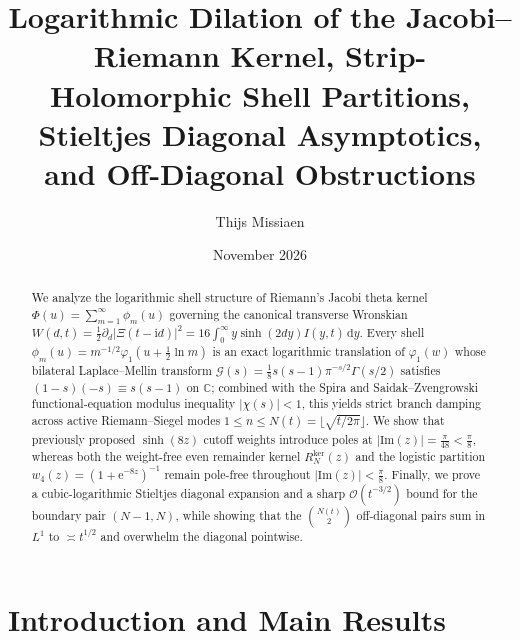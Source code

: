 \documentclass[11pt,reqno]{amsart}
\title[Logarithmic Dilation and Saddle-Point Shell Structure]{Logarithmic Dilation of the Jacobi--Riemann Kernel, Strip-Holomorphic Shell Partitions, Stieltjes Diagonal Asymptotics, and Off-Diagonal Obstructions}
\author{Thijs Missiaen}
\date{November 2026}
\theoremstyle{definition}
\theoremstyle{remark}
\numberwithin{equation}{section}
\newcommand{\C}{\mathbb{C}}
\newcommand{\dd}{\mathrm{d}}
\newcommand{\ii}{\mathrm{i}}
\newcommand{\ee}{\mathrm{e}}
\newcommand{\Ima}{\mathrm{Im}}
\begin{document}
\begin{abstract}
We analyze the logarithmic shell structure of Riemann's Jacobi theta kernel $\Phi(u) = \sum_{m=1}^{\infty} \phi_m(u)$ governing the canonical transverse Wronskian $W(d,t) = \frac{1}{2}\partial_d\lvert\Xi(t - \ii d)\rvert^2 = 16\int_0^{\infty} y\sinh(2dy)I(y,t)\,\dd y$. Every shell $\phi_m(u) = m^{-1/2}\varphi_1(u + \frac{1}{2}\ln m)$ is an exact logarithmic translation of $\varphi_1(w)$ whose bilateral Laplace--Mellin transform $\mathcal{G}(s) = \frac{1}{8}s(s-1)\pi^{-s/2}\Gamma(s/2)$ satisfies $(1-s)(-s) \equiv s(s-1)$ on $\C$; combined with the Spira and Saidak--Zvengrowski functional-equation modulus inequality $\lvert\chi(s)\rvert < 1$, this yields strict branch damping across active Riemann--Siegel modes $1 \le n \le N(t) = \lfloor\sqrt{t/2\pi}\rfloor$. We show that previously proposed $\sinh(8z)$ cutoff weights introduce poles at $\lvert\Ima(z)\rvert = \frac{\pi}{48} < \frac{\pi}{8}$, whereas both the weight-free even remainder kernel $R_N^{\mathrm{ker}}(z)$ and the logistic partition $w_4(z) = (1+\ee^{-8z})^{-1}$ remain pole-free throughout $\lvert\Ima(z)\rvert < \frac{\pi}{8}$. Finally, we prove a cubic-logarithmic Stieltjes diagonal expansion and a sharp $\mathcal{O}(t^{-3/2})$ bound for the boundary pair $(N-1,N)$, while showing that the $\binom{N(t)}{2}$ off-diagonal pairs sum in $L^1$ to $\asymp t^{1/2}$ and overwhelm the diagonal pointwise.
\end{abstract}

\maketitle

\section{Introduction and Main Results}\label{sec:intro}
\end{document}
